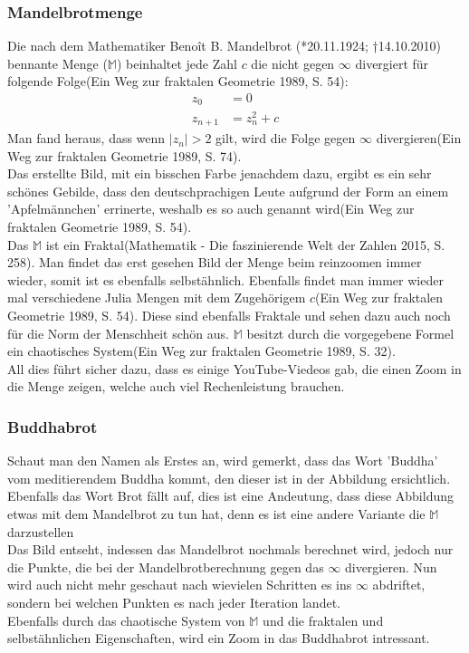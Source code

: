 \subsubsection{Mandelbrotmenge}
Die nach dem Mathematiker Benoît B. Mandelbrot (*20.11.1924; †14.10.2010) bennante Menge ($\mathbb{M}$) beinhaltet jede Zahl $c$ die nicht gegen $\infty$ divergiert für folgende Folge(Ein Weg zur fraktalen Geometrie 1989, S. 54):
\begin{align*}
z_0&=0\\
z_{n+1}&=z^2_n+c
\end{align*}
Man fand heraus, dass wenn $|z_n| > 2$ gilt, wird die Folge gegen $\infty$ divergieren(Ein Weg zur fraktalen Geometrie 1989, S. 74).\\
Das erstellte Bild, mit ein bisschen Farbe jenachdem dazu, ergibt es ein sehr schönes Gebilde, dass den deutschprachigen Leute aufgrund der Form an einem 'Apfelmännchen' errinerte, weshalb es so auch genannt wird(Ein Weg zur fraktalen Geometrie 1989, S. 54).\\
Das $\mathbb{M}$ ist ein Fraktal(Mathematik - Die faszinierende Welt der Zahlen 2015, S. 258). Man findet das erst gesehen Bild der Menge beim reinzoomen immer wieder, somit ist es ebenfalls selbstähnlich. Ebenfalls findet man immer wieder mal verschiedene Julia Mengen mit dem Zugehörigem $c$(Ein Weg zur fraktalen Geometrie 1989, S. 54). Diese sind ebenfalls Fraktale und sehen dazu auch noch für die Norm der Menschheit schön aus. $\mathbb{M}$ besitzt durch die vorgegebene Formel ein chaotisches System(Ein Weg zur fraktalen Geometrie 1989, S. 32).\\
All dies führt sicher dazu, dass es einige YouTube-Viedeos gab, die einen Zoom in die Menge zeigen, welche auch viel Rechenleistung brauchen.

\subsubsection{Buddhabrot}
Schaut man den Namen als Erstes an, wird gemerkt, dass das Wort 'Buddha' vom meditierendem Buddha kommt, den dieser ist in der Abbildung ersichtlich. Ebenfalls das Wort Brot fällt auf, dies ist eine Andeutung, dass diese Abbildung etwas mit dem Mandelbrot zu tun hat, denn es ist eine andere Variante die $\mathbb{M}$ darzustellen\\ 
Das Bild entseht, indessen das Mandelbrot nochmals berechnet wird, jedoch nur die Punkte, die bei der Mandelbrotberechnung gegen das $\infty$ divergieren. Nun wird auch nicht mehr geschaut nach wievielen Schritten es ins $\infty$ abdriftet, sondern bei welchen Punkten es nach jeder Iteration landet.\\
Ebenfalls durch das chaotische System von $\mathbb{M}$ und die fraktalen und selbstähnlichen Eigenschaften, wird ein Zoom in das Buddhabrot intressant.